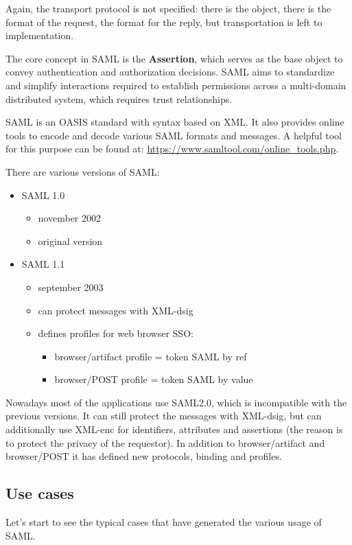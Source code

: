 Again, the transport protocol is not specified: there is the object,
there is the format of the request, the format for the reply, but
transportation is left to implementation.

The core concept in SAML is the \textbf{Assertion}, which serves as
the base object to convey authentication and authorization decisions.
SAML aims to standardize and simplify interactions required to
establish permissions across a multi-domain distributed system, which
requires trust relationships.

SAML is an OASIS standard with syntax based on XML. It also provides
online tools to encode and decode various SAML formats and messages. A
helpful tool for this purpose can be found at:
\url{https://www.samltool.com/online_tools.php}.

There are various versions of SAML:
\begin{itemize}
  \item SAML 1.0
    \begin{itemize}
      \item november 2002
      \item original version
    \end{itemize}
  \item SAML 1.1
    \begin{itemize}
      \item september 2003
      \item can protect messages with XML-dsig
      \item defines profiles for web browser SSO:
        \begin{itemize}
          \item browser/artifact profile = token SAML by ref
          \item browser/POST profile = token SAML by value
        \end{itemize}
    \end{itemize}
\end{itemize}

Nowadays most of the applications use SAML2.0, which is incompatible
with the previous versions. It can still protect the messages with
XML-dsig, but can additionally use XML-enc for identifiers, attributes
and assertions (the reason is to protect the privacy of the
requestor). In addition to browser/artifact and browser/POST it has
defined new protocols, binding and profiles.


\subsection{Use cases}
Let's start to see the typical cases that have generated the various
usage of SAML.

